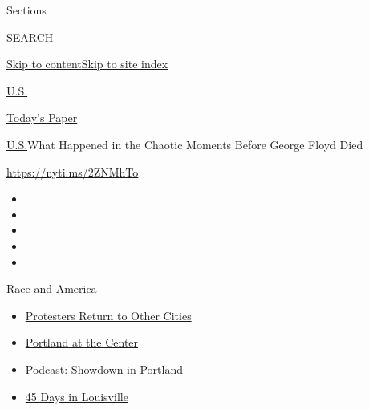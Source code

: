 Sections

SEARCH

\protect\hyperlink{site-content}{Skip to
content}\protect\hyperlink{site-index}{Skip to site index}

\href{https://www.nytimes3xbfgragh.onion/section/us}{U.S.}

\href{https://myaccount.nytimes3xbfgragh.onion/auth/login?response_type=cookie\&client_id=vi}{}

\href{https://www.nytimes3xbfgragh.onion/section/todayspaper}{Today's
Paper}

\href{/section/us}{U.S.}\textbar{}What Happened in the Chaotic Moments
Before George Floyd Died

\url{https://nyti.ms/2ZNMhTo}

\begin{itemize}
\item
\item
\item
\item
\item
\end{itemize}

\href{https://www.nytimes3xbfgragh.onion/news-event/george-floyd-protests-minneapolis-new-york-los-angeles?action=click\&pgtype=Article\&state=default\&region=TOP_BANNER\&context=storylines_menu}{Race
and America}

\begin{itemize}
\tightlist
\item
  \href{https://www.nytimes3xbfgragh.onion/2020/07/26/us/protests-portland-seattle-trump.html?action=click\&pgtype=Article\&state=default\&region=TOP_BANNER\&context=storylines_menu}{Protesters
  Return to Other Cities}
\item
  \href{https://www.nytimes3xbfgragh.onion/2020/07/24/us/portland-oregon-protests-white-race.html?action=click\&pgtype=Article\&state=default\&region=TOP_BANNER\&context=storylines_menu}{Portland
  at the Center}
\item
  \href{https://www.nytimes3xbfgragh.onion/2020/07/23/podcasts/the-daily/portland-protests.html?action=click\&pgtype=Article\&state=default\&region=TOP_BANNER\&context=storylines_menu}{Podcast:
  Showdown in Portland}
\item
  \href{https://www.nytimes3xbfgragh.onion/interactive/2020/07/16/us/black-lives-matter-protests-louisville-breonna-taylor.html?action=click\&pgtype=Article\&state=default\&region=TOP_BANNER\&context=storylines_menu}{45
  Days in Louisville}
\end{itemize}


